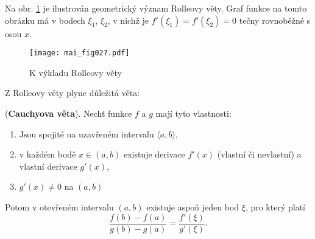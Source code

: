       \begin{note}
        Na obr. \ref{MAI:fig_027} je ilustrován geometrický význam Rolleovy věty. Graf funkce na 
        tomto obrázku má v bodech $\xi_1$, $\xi_2$, v nichž je $f'(\xi_1)=f'(\xi_2)=0$ tečny 
        rovnoběžné s osou $x$. 
        \begin{figure}[ht!] %
          \centering
          \texttt{[image: mai\_fig027.pdf]}
          \caption{K výkladu Rolleovy věty}
          \label{MAI:fig_027}
        \end{figure}
      \end{note}
      
      Z Rolleovy věty plyne důležitá věta:
      
      \begin{lemma}\label{MA1:lem_diff04}
        (\textbf{Cauchyova věta}). Nechť funkce $f$ a $g$ mají tyto vlastnosti:
        \begin{enumerate}[noitemsep]
          \item  Jsou spojité na uzavřeném intervalu $\langle a,b\rangle$,
          \item  v každém bodě $x\in(a,b)$ existuje derivace $f'(x)$ (vlastní či nevlastní) a 
                 vlastní derivace $g'(x)$,
          \item  $g'(x)\neq0$ na $(a,b)$
        \end{enumerate}
        Potom v otevřeném intervalu $(a,b)$ existuje aspoň jeden bod $\xi$, pro který platí
        \begin{equation}\label{MA1:eq_diff03}
          \frac{f(b)-f(a)}{g(b)-g(a)} = \frac{f'(\xi)}{g'(\xi)}.
        \end{equation} 
      \end{lemma} 
      
